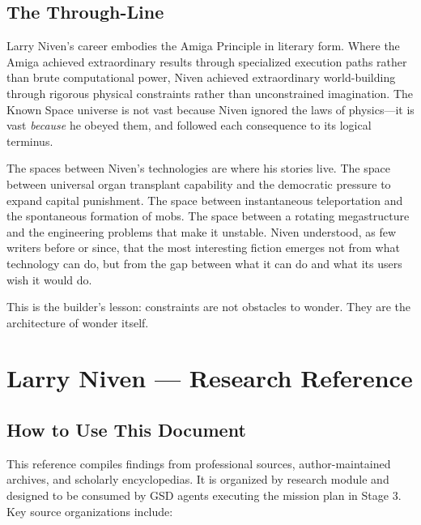 \documentclass[11pt,letterpaper]{article}
\newcommand{\stageheader}[2]{%
  \noindent\colorbox{#2}{\makebox[\textwidth][l]{%
    \textcolor{white}{\bfseries\sffamily\hspace{6pt}#1\hspace{6pt}}}}%
  \vspace{0.5em}\par%
}
\begin{document}
\subsection{The Through-Line}

Larry Niven's career embodies the Amiga Principle in literary form. Where the Amiga achieved extraordinary results through specialized execution paths rather than brute computational power, Niven achieved extraordinary world-building through rigorous physical constraints rather than unconstrained imagination. The Known Space universe is not vast because Niven ignored the laws of physics---it is vast \textit{because} he obeyed them, and followed each consequence to its logical terminus.

The spaces between Niven's technologies are where his stories live. The space between universal organ transplant capability and the democratic pressure to expand capital punishment. The space between instantaneous teleportation and the spontaneous formation of mobs. The space between a rotating megastructure and the engineering problems that make it unstable. Niven understood, as few writers before or since, that the most interesting fiction emerges not from what technology can do, but from the gap between what it can do and what its users wish it would do.

This is the builder's lesson: constraints are not obstacles to wonder. They are the architecture of wonder itself.

\newpage

\stageheader{STAGE 2 --- RESEARCH REFERENCE}{secondary}

\section{Larry Niven --- Research Reference}

\subsection{How to Use This Document}

This reference compiles findings from professional sources, author-maintained archives, and scholarly encyclopedias. It is organized by research module and designed to be consumed by GSD agents executing the mission plan in Stage 3. Key source organizations include:
\end{document}
